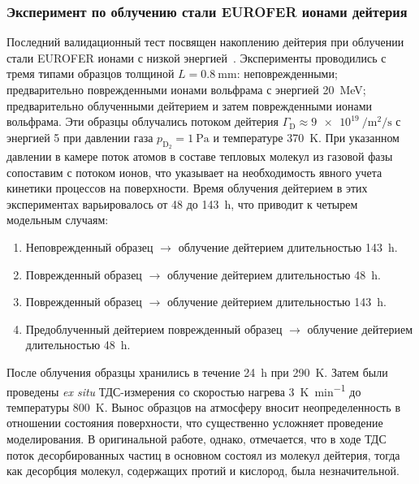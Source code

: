 \subsubsection{Эксперимент по облучению стали EUROFER ионами дейтерия}
Последний валидационный тест посвящен накоплению дейтерия при облучении стали EUROFER ионами с низкой энергией~\cite{Schmid2023_1}. Эксперименты проводились с тремя типами образцов толщиной \(L=\SI{0.8}{\milli\meter}\): неповрежденными; предварительно поврежденными ионами вольфрама с энергией \SI{20}{\mega\electronvolt}; предварительно облученными дейтерием и затем поврежденными ионами вольфрама. Эти образцы облучались потоком дейтерия $\Gamma_\mathrm{D}\approx\SI{9e19}{\per\meter\squared\per\second}$ с энергией \SI{5}{} при давлении газа $p_\mathrm{D_2}=\SI{1}{\pascal}$ и температуре \SI{370}{\kelvin}. При указанном давлении в камере поток атомов в составе тепловых молекул из газовой фазы сопоставим с потоком ионов, что указывает на необходимость явного учета кинетики процессов на поверхности. Время облучения дейтерием в этих экспериментах варьировалось от \num{48} до \SI{143}{\hour}, что приводит к четырем модельным случаям:
\begin{enumerate}[beginpenalty=10000]
    \item Неповрежденный образец $\rightarrow$ облучение дейтерием длительностью \SI{143}{\hour}.
    \item Поврежденный образец $\rightarrow$ облучение дейтерием длительностью \SI{48}{\hour}.
    \item Поврежденный образец $\rightarrow$ облучение дейтерием длительностью \SI{143}{\hour}.
    \item Предоблученный дейтерием поврежденный образец $\rightarrow$ облучение дейтерием длительностью \SI{48}{\hour}.
\end{enumerate}
После облучения образцы хранились в течение \SI{24}{\hour} при \SI{290}{\kelvin}. Затем были проведены \textit{ex situ} ТДС-измерения со скоростью нагрева \SI{3}{\kelvin\per\minute} до температуры \SI{800}{\kelvin}. Вынос образцов на атмосферу вносит неопределенность в отношении состояния поверхности, что существенно усложняет проведение моделирования. В оригинальной работе, однако, отмечается, что в ходе ТДС поток десорбированных частиц в основном состоял из молекул дейтерия, тогда как десорбция молекул, содержащих протий и кислород, была незначительной.

